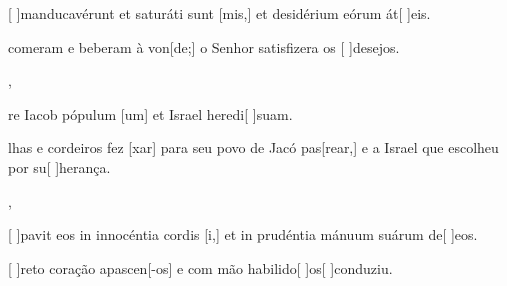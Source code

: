 {    {\item {}[ ]{man}ducavérunt et saturáti sunt [mis,] et desidérium eórum át[ ]{e}is.}%
        {\item {} comeram e beberam à von[de;] o Senhor satisfizera os [ ]{de}{se}jos.},
    {\item {}re Iacob pópulum [um] et Israel heredi[ ]{su}am.}%
        {\item {}lhas e cordeiros fez [xar] para seu povo de Jacó pas[rear,] e a Israel que escolheu por su[ ]{he}{ran}ça.},
    {\item {}[ ]{pa}vit eos in innocéntia cordis [i,] et in prudéntia mánuum suárum de[ ]{e}os.}%
        {\item {}[ ]{re}to coração apascen[-os] e com mão habilido[ ]{os}[ ]{con}duziu.}
}